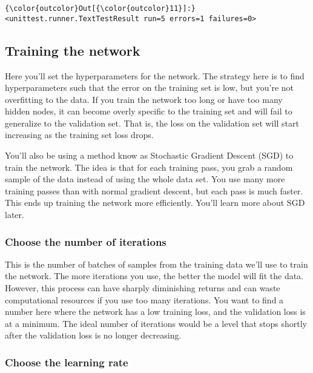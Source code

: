 \documentclass[11pt]{article}
\begin{document}
\begin{Verbatim}[commandchars=\\\{\}]
{\color{outcolor}Out[{\color{outcolor}11}]:} <unittest.runner.TextTestResult run=5 errors=1 failures=0>
\end{Verbatim}
            
    \subsection{Training the network}\label{training-the-network}

Here you'll set the hyperparameters for the network. The strategy here
is to find hyperparameters such that the error on the training set is
low, but you're not overfitting to the data. If you train the network
too long or have too many hidden nodes, it can become overly specific to
the training set and will fail to generalize to the validation set. That
is, the loss on the validation set will start increasing as the training
set loss drops.

You'll also be using a method know as Stochastic Gradient Descent (SGD)
to train the network. The idea is that for each training pass, you grab
a random sample of the data instead of using the whole data set. You use
many more training passes than with normal gradient descent, but each
pass is much faster. This ends up training the network more efficiently.
You'll learn more about SGD later.

\subsubsection{Choose the number of
iterations}\label{choose-the-number-of-iterations}

This is the number of batches of samples from the training data we'll
use to train the network. The more iterations you use, the better the
model will fit the data. However, this process can have sharply
diminishing returns and can waste computational resources if you use too
many iterations. You want to find a number here where the network has a
low training loss, and the validation loss is at a minimum. The ideal
number of iterations would be a level that stops shortly after the
validation loss is no longer decreasing.

\subsubsection{Choose the learning rate}\label{choose-the-learning-rate}
\end{document}

